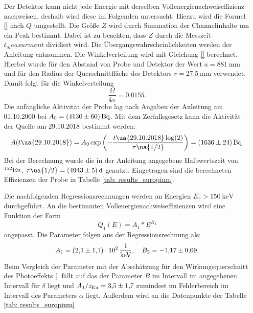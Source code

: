 \FloatBarrier
Der Detektor kann nicht jede Energie mit derselben Vollenergienachweiseffizienz
nachweisen, deshalb wird diese im Folgenden untersucht. Hierzu wird die Formel
\eqref{} nach $Q$ umgestellt. Die Größe $Z$ wird durch Summation der Channelinhalte
um ein Peak bestimmt. Dabei ist zu beachten, dass $Z$ durch die Messzeit $t_measurment$
dividiert wird. Die Übergangswahrscheinlichkeiten werden der Anleitung \cite{anleitungV18}
entnommen. Die Winkelverteilung wird mit Gleichung \eqref{} berechnet. Hierbei wurde
für den Abstand von Probe und Detektor der Wert $a=\SI{881}{\milli\meter}$ und für
den Radius der Querschnittfläche des Detektors $r=\SI{27.5}{\milli\meter}$
verwendet. Damit folgt für die Winkelverteilung
\begin{equation}
  \label{eq:winkelverteilung}
  \frac{\Omega}{4\pi}=\num{0.0155}.
\end{equation}
Die anfängliche Aktivität der Probe lag nach Angaben der Anleitung \cite{anleitungV18}
am 01.10.2000 bei $A_0=\SI{4130\pm60}{\becquerel}$. Mit dem Zerfallsgesetz kann die
Aktivität der Quelle am 29.10.2018 bestimmt werden:
\begin{equation}
  A(t\ua{29.10.2018})=A_0\exp\left(-\frac{t\ua{29.10.2018}\log(2)}{\tau\ua{1/2}}\right) = \SI{1636\pm24}{\becquerel}.
\end{equation}
Bei der Berechnung wurde die in der Anleitung \cite{anleitungV18} angegebene
Halbwertszeit von $^{152}\ce{Eu}$, $\tau\ua{1/2}=\SI{4943 \pm 5 }{\day}$ genutzt.
Eingetragen sind die berechneten Effizienzen der Probe in Tabelle \ref{tab: results_europium}.

Die nachfolgenden Regressionsrechnungen werden an Energien $E_\gamma>\SI{150}{\kilo\eV}$
durchgeführt.
An die bestimmten Vollenergienachweiseffizienzen wird eine Funktion der Form
\begin{equation*}
  Q_1(E)=A_1*E^{B_1}
\end{equation*}
angepasst. Die Parameter folgen aus der Regressionsrechnung als:
\begin{equation}
\label{eq:effizienz_Q_1}
A_1 = \SI{2.1\pm1.1 e2}{\per\kilo\eV}, \quad B_2=\num{-1.17\pm 0.09}.
\end{equation}
Beim Vergleich der Parameter mit der Abschätzung für den Wirkungsquerschnitt
des Photoeffekts \eqref{} fällt auf das der Parameter $B$ im Intervall im angegebenen
Intervall für $\delta$ liegt und $A_1/z_{\ce{Eu}}=\num{3.5\pm1.7}$ zumindest im
Fehlerbereich im Intervall des Parameters $\alpha$ liegt.
Außerdem wird an die Datenpunkte der Tabelle \ref{tab: results_europium}

